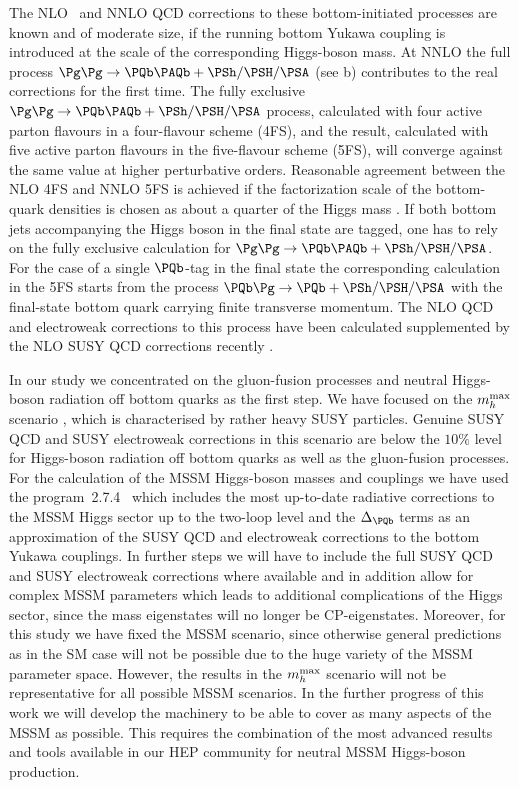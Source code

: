 The NLO~\cite{Dicus:1998hs,Balazs:1998sb} and NNLO
\cite{Harlander:2003ai} QCD corrections to these bottom-initiated
processes are known and of moderate size, if the running bottom Yukawa
coupling is introduced at the scale of the corresponding Higgs-boson
mass. At NNLO the full process $\Pg\Pg\to \PQb\PAQb + \PSh/\PSH/\PSA$
(see b) contributes to the real
corrections for the first time.  The fully exclusive $\Pg\Pg\to
\PQb\PAQb + \PSh/\PSH/\PSA$ process, calculated with four active parton
flavours in a four-flavour scheme (4FS), and the result, calculated with
five active parton flavours in the five-flavour scheme (5FS), will converge
against the same value at higher perturbative orders. Reasonable
agreement between the NLO 4FS and NNLO 5FS is achieved if the
factorization scale of the bottom-quark densities is chosen as about a
quarter of the Higgs mass \cite{Campbell:2004pu,Dawson:2005vi}.  If both
bottom jets accompanying the Higgs boson in the final state are tagged,
one has to rely on the fully exclusive calculation for $\Pg\Pg\to
\PQb\PAQb + \PSh/\PSH/\PSA$. For the case of a single $\PQb$-tag in the
final state the corresponding calculation in the 5FS starts from the
process $\PQb\Pg\to \PQb+\PSh/\PSH/\PSA$ with the final-state bottom
quark carrying finite transverse momentum.
The NLO QCD and electroweak corrections to this process have been
calculated \cite{Campbell:2002zm,Dawson:2004sh,Beccaria:2010fg}
supplemented by the NLO SUSY QCD corrections recently \cite{Dawson:2007ur}.


In our study we concentrated on the gluon-fusion processes and neutral
Higgs-boson radiation off bottom quarks as the first step. We have
focused on the $m_h^{\rm max}$ scenario \cite{Carena:2000dp,Carena:2002qg},
which is characterised by rather heavy SUSY particles. Genuine SUSY QCD
and SUSY electroweak corrections in this scenario are below the $10\%$
level for Higgs-boson radiation off bottom quarks as well as the 
gluon-fusion processes.  For the calculation of the MSSM Higgs-boson masses
and couplings we have used the program
\FeynHiggs\,2.7.4~\cite{Heinemeyer:1998yj,Heinemeyer:1998np,Degrassi:2002fi,
Frank:2006yh} which includes the most up-to-date radiative corrections
to the MSSM Higgs sector up to the two-loop level and the
$\Delta_{\PQb}$ terms as an approximation of the SUSY QCD and electroweak
corrections to the bottom Yukawa couplings. In further steps we will
have to include the full SUSY QCD and SUSY electroweak corrections
where available and in addition allow for complex MSSM parameters which
leads to additional complications of the Higgs sector, since the mass
eigenstates will no longer be CP-eigenstates.  Moreover, for this study
we have fixed the MSSM scenario, since otherwise general predictions as
in the SM case will not be possible due to the huge variety of the MSSM
parameter space.  However, the results in the $m_h^{\rm max}$ scenario will
not be representative for all possible MSSM scenarios. In the further
progress of this work we will develop the machinery to be able to cover
as many aspects of the MSSM as possible.  This requires the combination
of the most advanced results and tools available in our HEP community
for neutral MSSM Higgs-boson production.

